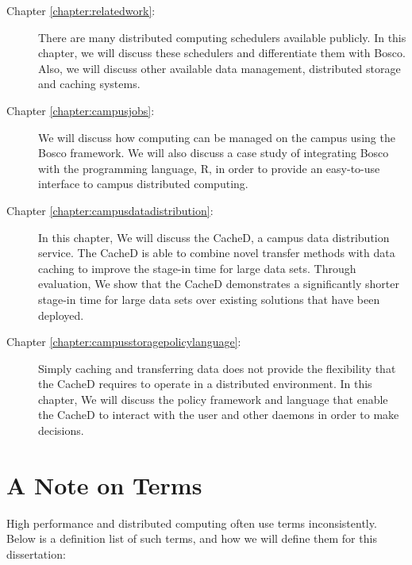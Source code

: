 \begin{description}
	\item[Chapter \ref{chapter:relatedwork}:]  There are many distributed computing schedulers available publicly.  In this chapter, we will discuss these schedulers and differentiate them with Bosco.  Also, we will discuss other available data management, distributed storage and caching systems.
	
	\item[Chapter \ref{chapter:campusjobs}:] We will discuss how computing can be managed on the campus using the Bosco framework.  We will also discuss a case study of integrating Bosco with the programming language, R, in order to provide an easy-to-use interface to campus distributed computing.
	
	\item[Chapter \ref{chapter:campusdatadistribution}:] In this chapter, We will discuss the CacheD, a campus data distribution service.  The CacheD is able to combine novel transfer methods with data caching to improve the stage-in time for large data sets.  Through evaluation, We show that the CacheD demonstrates a significantly shorter stage-in time for large data sets over existing solutions that have been deployed.
	
	\item[Chapter \ref{chapter:campusstoragepolicylanguage}:]  
	Simply caching and transferring data does not provide the flexibility that the CacheD requires to operate in a distributed environment.  In this chapter, We will discuss the policy framework and language that enable the CacheD to interact with the user and other daemons in order to make decisions.
\end{description}


\newpage
\section{A Note on Terms}
High performance and distributed computing often use terms inconsistently.  Below is a definition list of such terms, and how we will define them for this dissertation:


